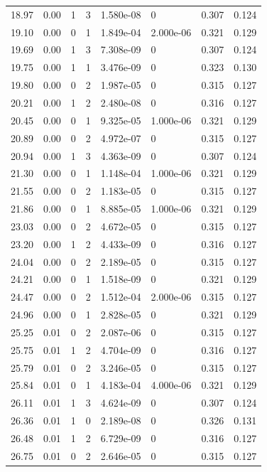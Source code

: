 \documentclass[preview]{standalone}
\begin{document}
{{{\begin{tabular}{L{1.2cm}C{1.2cm} C{0.3cm}C{0.5cm} C{1.4cm}C{1.4cm} C{1.4cm}C{1.4cm}}
  18.97  &  0.00  & 1     &  3 &  1.580e-08  & 0  & 0.307 &  0.124   \\ 
  19.10  &  0.00  & 0     &  1 &  1.849e-04  & 2.000e-06  & 0.321 &  0.129   \\ 
  19.69  &  0.00  & 1     &  3 &  7.308e-09  & 0  & 0.307 &  0.124   \\ 
  19.75  &  0.00  & 1     &  1 &  3.476e-09  & 0  & 0.323 &  0.130   \\ 
  19.80  &  0.00  & 0     &  2 &  1.987e-05  & 0  & 0.315 &  0.127   \\ 
  20.21  &  0.00  & 1     &  2 &  2.480e-08  & 0  & 0.316 &  0.127   \\ 
  20.45  &  0.00  & 0     &  1 &  9.325e-05  & 1.000e-06  & 0.321 &  0.129   \\ 
  20.89  &  0.00  & 0     &  2 &  4.972e-07  & 0  & 0.315 &  0.127   \\ 
  20.94  &  0.00  & 1     &  3 &  4.363e-09  & 0  & 0.307 &  0.124   \\ 
  21.30  &  0.00  & 0     &  1 &  1.148e-04  & 1.000e-06  & 0.321 &  0.129   \\ 
  21.55  &  0.00  & 0     &  2 &  1.183e-05  & 0  & 0.315 &  0.127   \\ 
  21.86  &  0.00  & 0     &  1 &  8.885e-05  & 1.000e-06  & 0.321 &  0.129   \\ 
  23.03  &  0.00  & 0     &  2 &  4.672e-05  & 0  & 0.315 &  0.127   \\ 
  23.20  &  0.00  & 1     &  2 &  4.433e-09  & 0  & 0.316 &  0.127   \\ 
  24.04  &  0.00  & 0     &  2 &  2.189e-05  & 0  & 0.315 &  0.127   \\ 
  24.21  &  0.00  & 0     &  1 &  1.518e-09  & 0  & 0.321 &  0.129   \\ 
  24.47  &  0.00  & 0     &  2 &  1.512e-04  & 2.000e-06  & 0.315 &  0.127   \\ 
  24.96  &  0.00  & 0     &  1 &  2.828e-05  & 0  & 0.321 &  0.129   \\ 
  25.25  &  0.01  & 0     &  2 &  2.087e-06  & 0  & 0.315 &  0.127   \\ 
  25.75  &  0.01  & 1     &  2 &  4.704e-09  & 0  & 0.316 &  0.127   \\ 
  25.79  &  0.01  & 0     &  2 &  3.246e-05  & 0  & 0.315 &  0.127   \\ 
  25.84  &  0.01  & 0     &  1 &  4.183e-04  & 4.000e-06  & 0.321 &  0.129   \\ 
  26.11  &  0.01  & 1     &  3 &  4.624e-09  & 0  & 0.307 &  0.124   \\ 
  26.36  &  0.01  & 1     &  0 &  2.189e-08  & 0  & 0.326 &  0.131   \\ 
  26.48  &  0.01  & 1     &  2 &  6.729e-09  & 0  & 0.316 &  0.127   \\ 
  26.75  &  0.01  & 0     &  2 &  2.646e-05  & 0  & 0.315 &  0.127   \\ 
\hline 
\end{tabular} 

}}}
\end{document}
